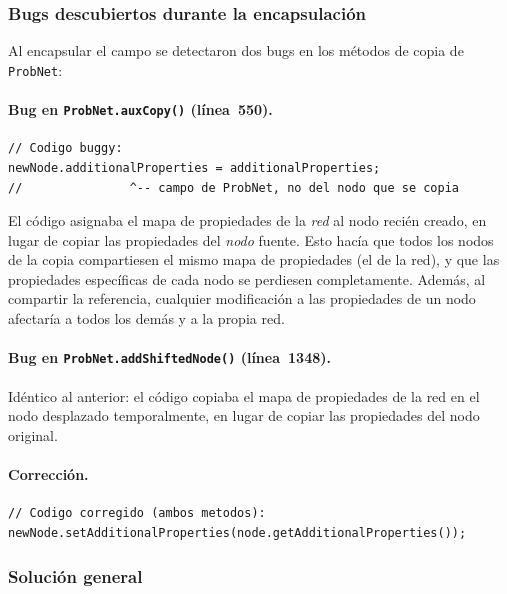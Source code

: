 \documentclass[11pt,a4paper]{article}
\newcommand{\code}[1]{\texttt{#1}}
\begin{document}
\subsubsection*{Bugs descubiertos durante la encapsulación}

Al encapsular el campo se detectaron dos bugs en los métodos de copia de
\code{ProbNet}:

\paragraph{Bug en \code{ProbNet.auxCopy()} (línea~550).}

\begin{lstlisting}
// Codigo buggy:
newNode.additionalProperties = additionalProperties;
//               ^-- campo de ProbNet, no del nodo que se copia
\end{lstlisting}

El código asignaba el mapa de propiedades de la \emph{red} al nodo
recién creado, en lugar de copiar las propiedades del \emph{nodo} fuente.
Esto hacía que todos los nodos de la copia compartiesen el mismo mapa de
propiedades (el de la red), y que las propiedades específicas de cada nodo
se perdiesen completamente. Además, al compartir la referencia, cualquier
modificación a las propiedades de un nodo afectaría a todos los demás y a
la propia red.

\paragraph{Bug en \code{ProbNet.addShiftedNode()} (línea~1348).}

Idéntico al anterior: el código copiaba el mapa de propiedades de la
red en el nodo desplazado temporalmente, en lugar de copiar las
propiedades del nodo original.

\paragraph{Corrección.}

\begin{lstlisting}
// Codigo corregido (ambos metodos):
newNode.setAdditionalProperties(node.getAdditionalProperties());
\end{lstlisting}

\subsubsection*{Solución general}
\end{document}
